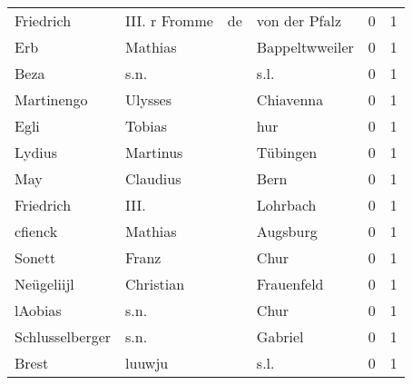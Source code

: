 \begin{center}
\begin{tiny}
\begin{longtabu}{llllrr}
                Friedrich &                      III. r Fromme &          de &                               von der Pfalz &          0 &         1 \\
                      Erb &                            Mathias &             &                              Bappeltwweiler &          0 &         1 \\
                     Beza &                               s.n. &             &                                        s.l. &          0 &         1 \\
               Martinengo &                            Ulysses &             &                                   Chiavenna &          0 &         1 \\
                     Egli &                             Tobias &             &                                         hur &          0 &         1 \\
                   Lydius &                           Martinus &             &                                    Tübingen &          0 &         1 \\
                      May &                           Claudius &             &                                        Bern &          0 &         1 \\
                Friedrich &                               III. &             &                                    Lohrbach &          0 &         1 \\
                  cfienck &                            Mathias &             &                                    Augsburg &          0 &         1 \\
                   Sonett &                              Franz &             &                                        Chur &          0 &         1 \\
               Neügeliijl &                          Christian &             &                                  Frauenfeld &          0 &         1 \\
                  lAobias &                               s.n. &             &                                        Chur &          0 &         1 \\
          Schlusselberger &                               s.n. &             &                                     Gabriel &          0 &         1 \\
                    Brest &                             luuwju &             &                                        s.l. &          0 &         1 \\

\end{longtabu}
\end{tiny}
\end{center}
